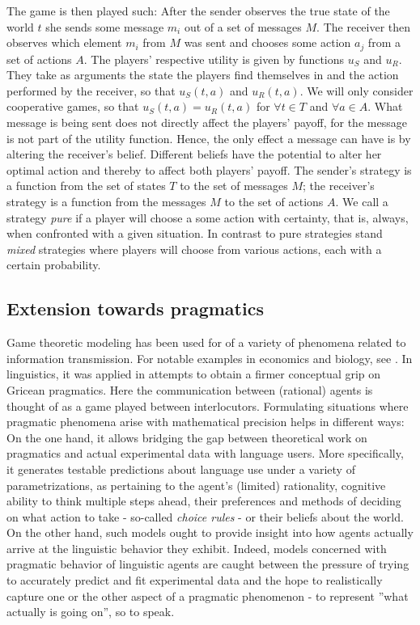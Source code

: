 \documentclass[10]{article}
\begin{document}
The game is then played such: After the sender observes the true state of the world $t$ she sends some message $m_i$ out of a set of messages $M$.
The receiver then observes which element $m_i$ from $M$ was sent and chooses some action $a_j$ from a set of actions $A$.
The players' respective utility is given by functions $u_S$ and $u_R$. They take as arguments the state the players find themselves in and the action performed by the receiver, so that $u_S(t,a)$ and $u_R(t,a)$. We will only consider cooperative games, so that $u_S(t,a)=u_R(t,a)$ for $\forall t\in T$ and $\forall a\in A$.
What message is being sent does not directly affect the players' payoff, for the message is not part of the utility function. Hence, the only effect a message can have is by altering the receiver's belief. Different beliefs have the potential to alter her optimal action and thereby to affect both players' payoff.
The sender's strategy is a function from the set of states $T$ to the set of messages $M$; the receiver's strategy is a function from the messages $M$ to the set of actions $A$.
We call a strategy \textit{pure} if a player will choose a some action with certainty, that is, always, when confronted with a given situation. In contrast to pure strategies stand
\textit{mixed} strategies where players will choose from various actions, each with a certain probability.

\subsection{Extension towards pragmatics}
Game theoretic modeling has been used for of a variety of phenomena related to information transmission. For notable examples in economics and biology, see \cite{spence1973job, smith1982evolution, cho1987signaling}.
In linguistics, it was applied in attempts to obtain a firmer conceptual grip on Gricean pragmatics. Here the communication between (rational) agents is thought of as a game played between interlocutors. Formulating situations where pragmatic phenomena arise with mathematical precision helps in different ways: On the one hand, it allows bridging the gap between theoretical work on pragmatics and actual experimental data with language users. More specifically, it generates testable predictions about language use under a variety of parametrizations, as pertaining to the agent's (limited) rationality, cognitive ability to think multiple steps ahead, their preferences and methods of deciding on what action to take - so-called \textit{choice rules} %
 - or their beliefs about the world. On the other hand, such models ought to provide insight into how agents actually arrive at the linguistic behavior they exhibit. %
 Indeed, models concerned with pragmatic behavior of linguistic agents are caught between the pressure of trying to accurately predict and fit experimental data and the hope to realistically capture one or the other aspect of a pragmatic phenomenon - to represent ''what actually is going on'', so to speak.
\end{document}
